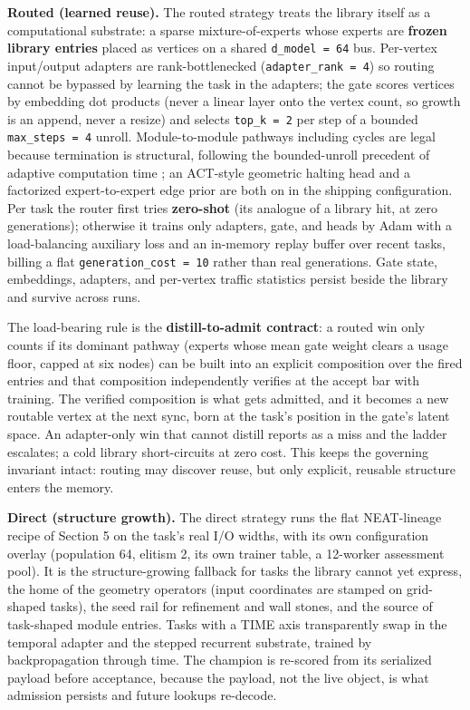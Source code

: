 \documentclass[11pt]{article}
\begin{document}
\textbf{Routed (learned reuse).} The routed strategy treats the library itself as a computational substrate: a sparse mixture-of-experts \citep{jacobs1991, shazeer2017} whose experts are \textbf{frozen library entries} placed as vertices on a shared \texttt{d_model = 64} bus. Per-vertex input/output adapters are rank-bottlenecked (\texttt{adapter_rank = 4}) so routing cannot be bypassed by learning the task in the adapters; the gate scores vertices by embedding dot products (never a linear layer onto the vertex count, so growth is an append, never a resize) and selects \texttt{top_k = 2} per step of a bounded \texttt{max_steps = 4} unroll. Module-to-module pathways including cycles are legal because termination is structural, following the bounded-unroll precedent of adaptive computation time \citep{graves2016}; an ACT-style geometric halting head and a factorized expert-to-expert edge prior are both on in the shipping configuration. Per task the router first tries \textbf{zero-shot} (its analogue of a library hit, at zero generations); otherwise it trains only adapters, gate, and heads by Adam with a load-balancing auxiliary loss and an in-memory replay buffer over recent tasks, billing a flat \texttt{generation_cost = 10} rather than real generations. Gate state, embeddings, adapters, and per-vertex traffic statistics persist beside the library and survive across runs.

The load-bearing rule is the \textbf{distill-to-admit contract}: a routed win only counts if its dominant pathway (experts whose mean gate weight clears a usage floor, capped at six nodes) can be built into an explicit composition over the fired entries and that composition independently verifies at the accept bar with training. The verified composition is what gets admitted, and it becomes a new routable vertex at the next sync, born at the task's position in the gate's latent space. An adapter-only win that cannot distill reports as a miss and the ladder escalates; a cold library short-circuits at zero cost. This keeps the governing invariant intact: routing may discover reuse, but only explicit, reusable structure enters the memory.

\textbf{Direct (structure growth).} The direct strategy runs the flat NEAT-lineage recipe of Section 5 on the task's real I/O widths, with its own configuration overlay (population 64, elitism 2, its own trainer table, a 12-worker assessment pool). It is the structure-growing fallback for tasks the library cannot yet express, the home of the geometry operators (input coordinates are stamped on grid-shaped tasks), the seed rail for refinement and wall stones, and the source of task-shaped module entries. Tasks with a TIME axis transparently swap in the temporal adapter and the stepped recurrent substrate, trained by backpropagation through time. The champion is re-scored from its serialized payload before acceptance, because the payload, not the live object, is what admission persists and future lookups re-decode.
\end{document}
